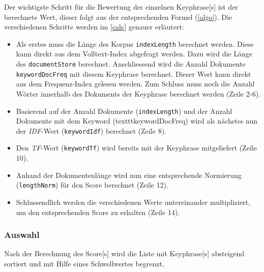 
Der wichtigste Schritt für die Bewertung der einzelnen \gls{Keyphrase}[s] ist der berechnete Wert, dieser folgt aus der entsprechenden Formel (\autoref{algo}). Die verschiedenen Schritte werden im \autoref{calc} genauer erläutert:
\begin{itemize}
    \item Als erstes muss die Länge des Korpus \texttt{indexLength} berechnet werden. Diese kann direkt aus dem Volltext-Index abgefragt werden. Dazu wird die Länge des \texttt{documentStore} berechnet. Anschliessend wird die Anzahl Dokumente \texttt{keywordDocFreq} mit diesem \gls{Keyphrase} berechnet. Dieser Wert kann direkt aus dem Frequenz-Index gelesen werden. Zum Schluss muss noch die Anzahl Wörter innerhalb des Dokuments der \gls{Keyphrase} berechnet werden (Zeile 2-6). 
    \item Basierend auf der Anzahl Dokumente (\texttt{indexLength}) und der Anzahl Dokumente mit dem \gls{Keyword} (texttt{keywordDocFreq}) wird als nächstes nun der \textit{IDF}-Wert (\texttt{keywordIdf}) berechnet (Zeile 8). \item Den \textit{TF}-Wert (\texttt{keywordTf}) wird bereits mit der \gls{Keyphrase} mitgeliefert (Zeile 10).
    \item Anhand der Dokumentenlänge wird nun eine entsprechende Normierung (\texttt{lengthNorm}) für den \gls{Score} berechnet (Zeile 12).
    \item Schlussendlich werden die verschiedenen Werte untereinander multipliziert, um den entsprechenden \gls{Score} zu erhalten (Zeile 14).
\end{itemize}



\subsubsection{Auswahl}


Nach der Berechnung des \gls{Score}[s] wird die Liste mit \gls{Keyphrase}[s] absteigend sortiert und mit Hilfe eines Schwellwertes begrenzt.

